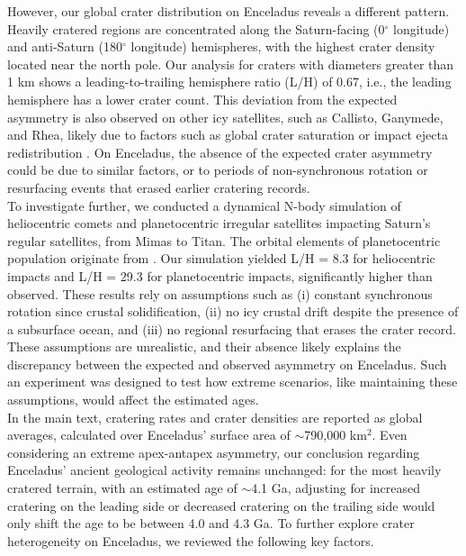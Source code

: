 \documentclass[preprint,12pt,3p,times,authoryear]{elsarticle}
\begin{document}
However, our global crater distribution on Enceladus reveals a different pattern. Heavily cratered regions are concentrated along the Saturn-facing (0$^\circ$ longitude) and anti-Saturn (180$^\circ$ longitude) hemispheres, with the highest crater density located near the north pole. Our analysis for craters with diameters greater than 1 km shows a leading-to-trailing hemisphere ratio (L/H) of 0.67, i.e., the leading hemisphere has a lower crater count. This deviation from the expected asymmetry is also observed on other icy satellites, such as Callisto, Ganymede, and Rhea, likely due to factors such as global crater saturation or impact ejecta redistribution \citep{Zahnle2003,Xu2017,Schenk2020}. On Enceladus, the absence of the expected crater asymmetry could be due to similar factors, or to periods of non-synchronous rotation or resurfacing events that erased earlier cratering records.\\

To investigate further, we conducted a dynamical N-body simulation of heliocentric comets and planetocentric irregular satellites impacting Saturn's regular satellites, from Mimas to Titan. The  orbital elements of planetocentric population originate from \citet{Nesvorny2007}. Our simulation yielded L/H = 8.3 for heliocentric impacts and L/H = 29.3 for planetocentric impacts, significantly higher than observed. These results rely on assumptions such as (i) constant synchronous rotation since crustal solidification, (ii) no icy crustal drift despite the presence of a subsurface ocean, and (iii) no regional resurfacing that erases the crater record. These assumptions are unrealistic, and their absence likely explains the discrepancy between the expected and observed asymmetry on Enceladus. Such an experiment was designed to test how extreme scenarios, like maintaining these assumptions, would affect the estimated ages.\\

In the main text, cratering rates and crater densities are reported as global averages, calculated over Enceladus' surface area of $\sim$790,000 km$^2$. Even considering an extreme apex-antapex asymmetry, our conclusion regarding Enceladus' ancient geological activity remains unchanged: for the most heavily cratered terrain, with an estimated age of $\sim$4.1 Ga, adjusting for increased cratering on the leading side or decreased cratering on the trailing side would only shift the age to be between 4.0 and 4.3 Ga.
To further explore crater heterogeneity on Enceladus, we reviewed the following key factors.\\
\end{document}
